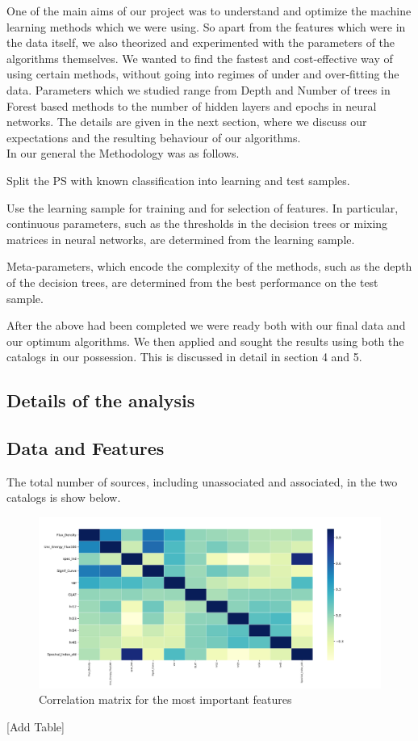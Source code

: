 One of the main aims of our project was to understand and optimize the machine learning methods which we were using. So apart from the features which were in the data itself, we also theorized and experimented with the parameters of the algorithms themselves. We wanted to find the fastest and cost-effective way of using certain methods, without going into regimes of under and over-fitting the data. Parameters which we studied range from Depth and Number of trees in Forest based methods to the number of hidden layers and epochs in neural networks. The details are given in the next section, where we discuss our expectations and the resulting behaviour of our algorithms.\\
  
In our general the Methodology was as follows.
\ben
\item
Split the PS with known classification into learning and test samples.
\item
Use the learning sample for training and for selection of features.
In particular, continuous parameters, such as the thresholds in the decision trees or mixing matrices in neural networks, are determined from the learning sample. 
\item
Meta-parameters, which encode the complexity of the methods, such as the depth of the decision trees,
are determined from the best performance on the test sample.
\een

After the above had been completed we were ready both with our final data and our optimum algorithms. We then applied and sought the results using both the catalogs in our possession. This is discussed in detail in section 4 and 5.\\

\subsection{Details of the analysis}

\subsection{Data and Features}

The total number of sources, including unassociated and associated, in the two catalogs is show below. \\
\begin{figure}[h]
\includegraphics[width=\onepic\textwidth]{correlation.pdf}
\caption{Correlation matrix for the most important features}
\label{fig:corr}
\end{figure}
[Add Table]\\


